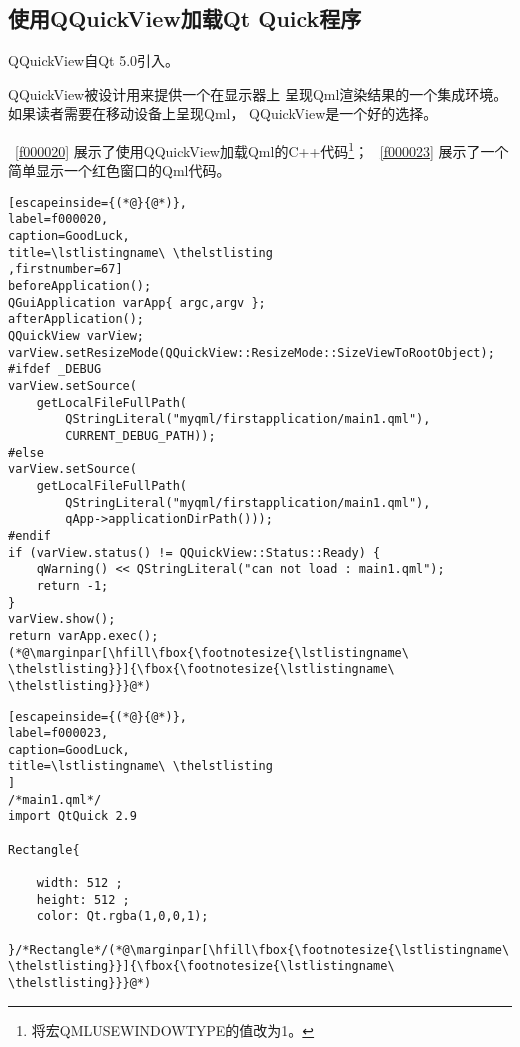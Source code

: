 \FloatBarrier
\subsection{
使用QQuickView加载Qt Quick程序
}\label{ss001010}


QQuickView自Qt 5.0引入。

QQuickView被设计用来提供一个在显示器上
呈现Qml渲染结果的一个集成环境。
如果读者需要在移动设备上呈现Qml，
QQuickView是一个好的选择。

\lstlistingname\ \ref{f000020}
展示了使用QQuickView加载Qml的C{\sourcefonttwo{}+}{\sourcefonttwo{}+}代码\footnote{
将宏QML\underline{\hspace{0.5em}}USE\underline{\hspace{0.5em}}WINDOW\underline{\hspace{0.5em}}TYPE的值改为1。
}；
\lstlistingname\ \ref{f000023}
展示了一个简单显示一个红色窗口的Qml代码。

\FloatBarrier
\begin{lstlisting}[escapeinside={(*@}{@*)},
label=f000020,
caption=GoodLuck,
title=\lstlistingname\ \thelstlisting
,firstnumber=67]
beforeApplication();
QGuiApplication varApp{ argc,argv };
afterApplication();
QQuickView varView;
varView.setResizeMode(QQuickView::ResizeMode::SizeViewToRootObject);
#ifdef _DEBUG
varView.setSource(
    getLocalFileFullPath(
        QStringLiteral("myqml/firstapplication/main1.qml"),
        CURRENT_DEBUG_PATH));
#else
varView.setSource(
    getLocalFileFullPath(
        QStringLiteral("myqml/firstapplication/main1.qml"),
        qApp->applicationDirPath()));
#endif
if (varView.status() != QQuickView::Status::Ready) {
    qWarning() << QStringLiteral("can not load : main1.qml");
    return -1;
}
varView.show();
return varApp.exec();(*@\marginpar[\hfill\fbox{\footnotesize{\lstlistingname\ \thelstlisting}}]{\fbox{\footnotesize{\lstlistingname\ \thelstlisting}}}@*)\end{lstlisting}          %
\FloatBarrier
\begin{lstlisting}[escapeinside={(*@}{@*)},
label=f000023,
caption=GoodLuck,
title=\lstlistingname\ \thelstlisting
]
/*main1.qml*/
import QtQuick 2.9

Rectangle{

    width: 512 ;
    height: 512 ;
    color: Qt.rgba(1,0,0,1);

}/*Rectangle*/(*@\marginpar[\hfill\fbox{\footnotesize{\lstlistingname\ \thelstlisting}}]{\fbox{\footnotesize{\lstlistingname\ \thelstlisting}}}@*)\end{lstlisting}          %


